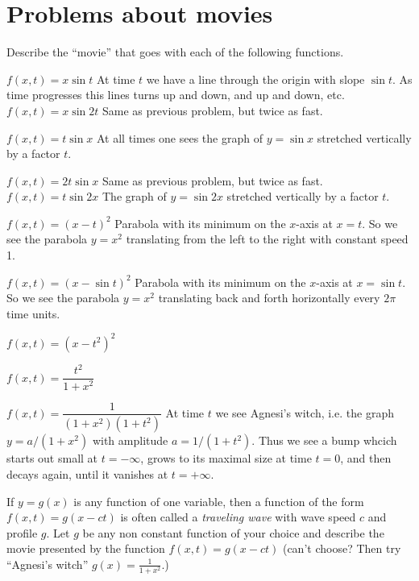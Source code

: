\section*{Problems about movies} %
\problem  Describe the ``movie'' that goes with each of the following
functions.

\subprob $f(x, t) = x\sin t$\hspace{6em}
\answer
At time $t$ we have a line through the origin with slope $\sin t$.
As time progresses this lines turns up and down, and up and down,  etc.
\endanswer
\subprob $f(x, t) = x\sin 2t$\hspace{6em}
\answer
Same as previous problem, but twice as fast.
\endanswer

\subprob $f(x, t) = t\sin x$
\answer
At all times one sees the graph of $y=\sin x$ stretched vertically by a factor $t$.
\endanswer

\subprob $f(x, t) = 2t \sin x$
\answer
Same as previous problem, but twice as fast.
\endanswer
\subprob $f(x, t) = t\sin 2x$
\answer
The graph of $y=\sin 2x$ stretched vertically by a factor $t$.
\endanswer

\subprob $f(x, t) = (x-t)^2$
\answer
Parabola with its minimum on the $x$-axis at $x=t$.
So we see the parabola $y=x^2$ translating from the left to the right
with constant speed 1.
\endanswer

\subprob $f(x, t) = (x-\sin t)^2$
\answer
Parabola with its minimum on the $x$-axis at $x=\sin t$.
So we see the parabola $y=x^2$ translating back and forth horizontally
every $2\pi$ time units.
\endanswer

\subprob $f(x, t) = (x-t^2)^2$

\subprob $f(x, t) = \dfrac{t^2}{1+x^2}$

\subprob $f(x, t) = \dfrac{1}{(1+x^2) (1+t^2)}$
\answer
At time $t$ we see Agnesi's witch, i.e. the graph $y= a/(1+x^2)$
with amplitude $a=1/(1+t^2)$.  Thus we see a bump whcich starts out small
 at $t=-\infty$, grows to its maximal size at time $t=0$, and then decays
again, until it vanishes at $t=+\infty$.
\endanswer


\problem
\label{prb:01traveling-waves} 
If $y=g(x)$ is any function of one variable, then a function of the
form $f(x, t) = g(x-ct)$ is often called a \emph{traveling wave} with
wave speed $c$ and profile $g$.  Let $g$ be any non constant
function of your choice and describe the movie presented by the
function $f(x, t) = g(x-ct)$ (can't choose?  Then try ``Agnesi's
witch'' $g(x) = \frac{1}{1+x^2}$.)


